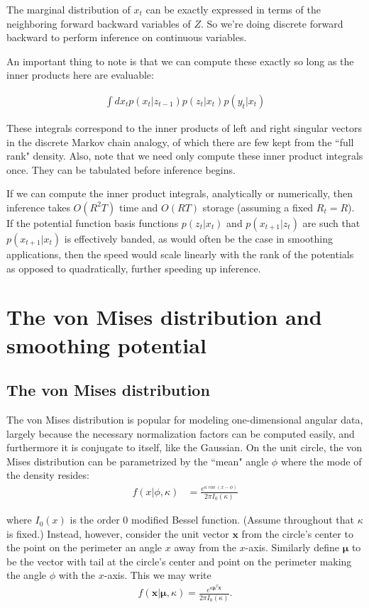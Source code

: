 \documentclass[11pt]{article}
\begin{document}
\noindent The marginal distribution of $x_t$ can be exactly expressed in terms of the neighboring forward backward variables of $Z$. So we’re doing discrete forward backward to perform inference on continuous variables.

An important thing to note is that we can compute these exactly so long as the inner products here are evaluable:

\begin{align*}
\int dx_t p(x_t|z_{t-1}) p(z_t|x_t) p(y_t|x_t)
\end{align*}

\noindent These integrals correspond to the inner products of left and right singular vectors in the discrete Markov chain analogy, of which there are few kept from the ``full rank" density. Also, note that we need only compute these inner product integrals once. They can be tabulated before inference begins.

If we can compute the inner product integrals, analytically or numerically, then inference takes $O(R^2 T)$ time and $O(RT)$ storage (assuming a fixed $R_t=R$). If the potential function basis functions $p(z_t | x_t)$ and $p(x_{t+1} | z_t)$ are such that $p(x_{t+1}|x_t)$ is effectively banded, as would often be the case in smoothing applications, then the speed would scale linearly with the rank of the potentials as opposed to quadratically, further speeding up inference.

\section{The von Mises distribution and smoothing potential}
\label{sec:von_mises_distribution}

\subsection{The von Mises distribution}

The von Mises distribution is popular for modeling one-dimensional angular data, largely because the necessary normalization factors can be computed easily, and furthermore it is conjugate to itself, like the Gaussian. On the unit circle, the von Mises distribution can be parametrized by the ``mean" angle $\phi$ where the mode of the density resides:
%
\begin{align*}
f(x|\phi,\kappa) &= \frac{e^{\kappa\cos(x-\phi)}}{2\pi I_0(\kappa)}
\end{align*}

\noindent where $I_0(x)$ is the order 0 modified Bessel function. (Assume throughout that $\kappa$ is fixed.) Instead, however, consider the unit vector $\mathbf{x}$ from the circle's center to the point on the perimeter an angle $x$ away from the $x$-axis. Similarly define $\mathbf{\mu}$ to be the vector with tail at the circle's center and point on the perimeter making the angle $\phi$ with the $x$-axis. This we may write
%
\begin{align*}
f(\mathbf{x}|\mathbf{\mu},\kappa) = \frac{e^{\kappa \mathbf{\mu}^T \mathbf{x}}}{2\pi I_0(\kappa)}.
\end{align*}
\end{document}
